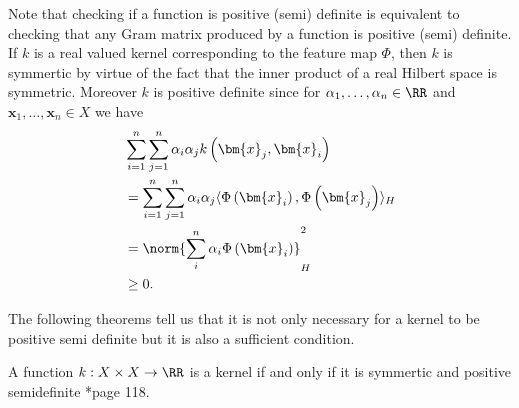 Note that checking if a function is positive (semi) definite is equivalent to checking that any Gram matrix produced by a function is positive (semi) definite. If $k$ is a real valued kernel corresponding to the feature map $\Phi$, then $k$ is symmertic by virtue of the fact that the inner product of a real Hilbert space is symmetric. Moreover $k$ is positive definite since for $\alpha_1 , \ldots , \alpha_n \in \RR$ and $\bm{x}_1 ,\ldots , \bm{x}_n \in X$ we have
\begin{align*}
     & \sum_{i=1}^{n} \sum_{j=1}^{n} \alpha_i \alpha_j k \left( \bm{x}_j , \bm{x}_i \right)                                           \\
     & = \sum_{i=1}^{n} \sum_{j=1}^{n} \alpha_i \alpha_j \langle \Phi \left( \bm{x}_i \right), \Phi \left( \bm{x}_j \right) \rangle_H \\
     & = \norm{ \sum_i^n \alpha_i \Phi \left( \bm{x}_i \right) }_{H}^{2}                                                              \\
     & \geq 0.
\end{align*}

The following theorems tell us that it is not only necessary for a kernel to be positive semi definite but it is also a sufficient condition.

\begin{thm} \label{theorem: nec_and_suf_kernel_1}
    A function $k : X \times X \to \RR$ is a kernel if and only if it is symmertic and positive semidefinite \cite{SteinwartIngo2008SVMb}*{page 118}.
\end{thm}

